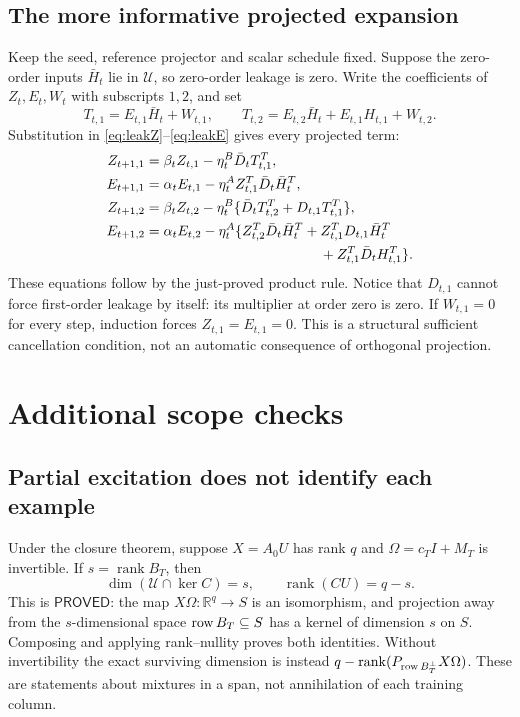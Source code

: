 \documentclass[12pt,a4paper]{article}
\theoremstyle{readable}
\theoremstyle{definition}\newtheorem{example}[theorem]{Example}
\newcommand{\R}{\mathbb R}\newcommand{\rank}{\operatorname{rank}}
\newcommand{\PP}{\mathsf{PROVED}}\newcommand{\FF}{\mathsf{FALSE}}
\begin{document}
\subsection{The more informative projected expansion}
Keep the seed, reference projector and scalar schedule fixed. Suppose the zero-order inputs \(\bar H_t\) lie in \(\mathcal U\), so zero-order leakage is zero. Write the coefficients of \(Z_t,E_t,W_t\) with subscripts \(1,2\), and set
\[
T_{t,1}=E_{t,1}\bar H_t+W_{t,1},\qquad
T_{t,2}=E_{t,2}\bar H_t+E_{t,1}H_{t,1}+W_{t,2}.
\]
Substitution in \eqref{eq:leakZ}--\eqref{eq:leakE} gives every projected term:
\begin{align*}
Z_{t+1,1}&=\beta_tZ_{t,1}-\eta_t^B\bar D_tT_{t,1}^T,\\
E_{t+1,1}&=\alpha_tE_{t,1}-\eta_t^A Z_{t,1}^T\bar D_t\bar H_t^T,\\
Z_{t+1,2}&=\beta_tZ_{t,2}-\eta_t^B\{\bar D_tT_{t,2}^T+D_{t,1}T_{t,1}^T\},\\
E_{t+1,2}&=\alpha_tE_{t,2}-\eta_t^A\{Z_{t,2}^T\bar D_t\bar H_t^T
+Z_{t,1}^TD_{t,1}\bar H_t^T\\
&\hspace{44mm}+Z_{t,1}^T\bar D_tH_{t,1}^T\}.
\end{align*}
These equations follow by the just-proved product rule. Notice that \(D_{t,1}\) cannot force first-order leakage by itself: its multiplier at order zero is zero. If \(W_{t,1}=0\) for every step, induction forces \(Z_{t,1}=E_{t,1}=0\). This is a structural sufficient cancellation condition, not an automatic consequence of orthogonal projection.

\section{Additional scope checks}
\label{app:scope}

\subsection{Partial excitation does not identify each example}
Under the closure theorem, suppose \(X=A_0U\) has rank \(q\) and \(\Omega=c_TI+M_T\) is invertible. If \(s=\rank B_T\), then
\[
\dim(\mathcal U\cap\ker C)=s,\qquad \rank(CU)=q-s.
\]
This is \(\PP\): the map \(X\Omega:\R^q\to S\) is an isomorphism, and projection away from the \(s\)-dimensional space \(\operatorname{row} B_T\subseteq S\) has a kernel of dimension \(s\) on \(S\). Composing and applying rank--nullity proves both identities. Without invertibility the exact surviving dimension is instead
\(q-\rank(P_{\row B_T^\perp}X\Omega)\). These are statements about mixtures in a span, not annihilation of each training column.
\end{document}
